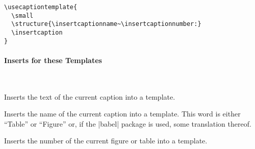 \begin{command}{\usecaptiontemplate{}}
  \example
\begin{verbatim}
\usecaptiontemplate{
  \small
  \structure{\insertcaptionname~\insertcaptionnumber:}
  \insertcaption
}
\end{verbatim}
\end{command}



\paragraph{Inserts for these Templates}\
 
\begin{command}{\insertcaption}
  Inserts the text of the current caption into a template.
\end{command}

\begin{command}{\insertcaptionname}
  Inserts the name of the current caption into a template. This word
  is either ``Table'' or ``Figure'' or, if the |babel| package is
  used, some translation thereof.
\end{command}

\begin{command}{\insertcaptionnumber}
  Inserts the number of the current figure or table into a template.
\end{command}











